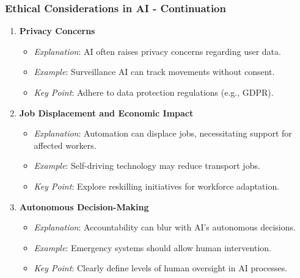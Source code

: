 \documentclass[aspectratio=169]{beamer}
\begin{document}
\begin{frame}[fragile]
    \frametitle{Ethical Considerations in AI - Continuation}
    \begin{enumerate}[resume]
        \item \textbf{Privacy Concerns}
            \begin{itemize}
                \item \textit{Explanation}: AI often raises privacy concerns regarding user data.
                \item \textit{Example}: Surveillance AI can track movements without consent.
                \item \textit{Key Point}: Adhere to data protection regulations (e.g., GDPR).
            \end{itemize}
        
        \item \textbf{Job Displacement and Economic Impact}
            \begin{itemize}
                \item \textit{Explanation}: Automation can displace jobs, necessitating support for affected workers.
                \item \textit{Example}: Self-driving technology may reduce transport jobs.
                \item \textit{Key Point}: Explore reskilling initiatives for workforce adaptation.
            \end{itemize}

        \item \textbf{Autonomous Decision-Making}
            \begin{itemize}
                \item \textit{Explanation}: Accountability can blur with AI's autonomous decisions.
                \item \textit{Example}: Emergency systems should allow human intervention.
                \item \textit{Key Point}: Clearly define levels of human oversight in AI processes.
            \end{itemize}
    \end{enumerate}
\end{frame}
\end{document}
